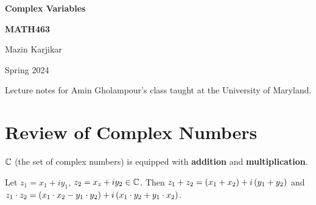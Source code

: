 \documentclass{article}
\begin{document}
  \begin{titlepage}
    \centering
    \vspace*{3cm}
    
    \Huge \textbf{Complex Variables} \par
    \Huge \textbf{MATH463} \par
    \vspace{1cm}
    \Huge Mazin Karjikar\par
    \vspace{1cm}
    \huge Spring 2024 \par
    \vspace{2cm}
    \Large
    Lecture notes for Amin Gholampour's class taught 
    at the University of Maryland.
    
  \end{titlepage}

  \tableofcontents

  \newpage

  \section{Review of Complex Numbers} \vspace{7mm}


  \begin{framed}\begin{spacing}{1.2}
    
    ${\mathbb C}$ (the set of complex numbers) is equipped with \textbf{addition}
    and \textbf{multiplication}. 

  Let $z_1 = x_1 + iy_1$, $z_2 = x_z + iy_2 \in {\mathbb C}$. Then \el
  $z_1 + z_2 = \left(x_1+x_2\right) + i\left(y_1+y_2\right)$ and \el
  $z_1 \cdot z_2 = \left(x_1 \cdot x_2 - y_1 \cdot y_2\right) + 
  i\left(x_1 \cdot y_2 + y_1 \cdot x_2\right)$. 
  \end{spacing}
  \end{framed} 

  
\end{document}
